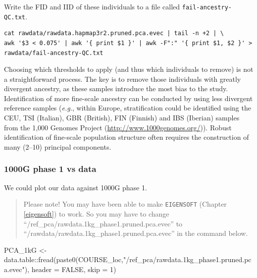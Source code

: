 \documentclass[
]{book}
\newenvironment{Shaded}{\begin{snugshade}}{\end{snugshade}}
\newcommand{\AttributeTok}[1]{\textcolor[rgb]{0.77,0.63,0.00}{#1}}
\newcommand{\ConstantTok}[1]{\textcolor[rgb]{0.00,0.00,0.00}{#1}}
\newcommand{\DecValTok}[1]{\textcolor[rgb]{0.00,0.00,0.81}{#1}}
\newcommand{\FunctionTok}[1]{\textcolor[rgb]{0.00,0.00,0.00}{#1}}
\newcommand{\NormalTok}[1]{#1}
\newcommand{\OtherTok}[1]{\textcolor[rgb]{0.56,0.35,0.01}{#1}}
\newcommand{\SpecialCharTok}[1]{\textcolor[rgb]{0.00,0.00,0.00}{#1}}
\newcommand{\StringTok}[1]{\textcolor[rgb]{0.31,0.60,0.02}{#1}}
\begin{document}
Write the FID and IID of these individuals to a file called \texttt{fail-ancestry-QC.txt}.

\begin{verbatim}
cat rawdata/rawdata.hapmap3r2.pruned.pca.evec | tail -n +2 | \
awk '$3 < 0.075' | awk '{ print $1 }' | awk -F":" '{ print $1, $2 }' > rawdata/fail-ancestry-QC.txt
\end{verbatim}

Choosing which thresholds to apply (and thus which individuals to remove) is not a straightforward process. The key is to remove those individuals with greatly divergent ancestry, as these samples introduce the most bias to the study. Identification of more fine-scale ancestry can be conducted by using less divergent reference samples (\emph{e.g.}, within Europe, stratification could be identified using the CEU, TSI (Italian), GBR (British), FIN (Finnish) and IBS (Iberian) samples from the 1,000 Genomes Project (\url{http://www.1000genomes.org/})). Robust identification of fine-scale population structure often requires the construction of many (2--10) principal components.

\hypertarget{g-phase-1-vs-data-1}{%
\subsubsection{1000G phase 1 vs data}\label{g-phase-1-vs-data-1}}

We could plot our data against 1000G phase 1.

\begin{quote}
Please note! You may have been able to make \texttt{EIGENSOFT} (Chapter \ref{eigensoft}) to work. So you may have to change ``/ref\_pca/rawdata.1kg\_phase1.pruned.pca.evec'' to ``/rawdata/rawdata.1kg\_phase1.pruned.pca.evec'' in the command below.
\end{quote}

\begin{Shaded}
\begin{Highlighting}[]
\NormalTok{PCA\_1kG }\OtherTok{\textless{}{-}}\NormalTok{ data.table}\SpecialCharTok{::}\FunctionTok{fread}\NormalTok{(}\FunctionTok{paste0}\NormalTok{(COURSE\_loc,}\StringTok{"/ref\_pca/rawdata.1kg\_phase1.pruned.pca.evec"}\NormalTok{), }\AttributeTok{header =} \ConstantTok{FALSE}\NormalTok{, }\AttributeTok{skip =} \DecValTok{1}\NormalTok{)}
\end{Highlighting}
\end{Shaded}
\end{document}
